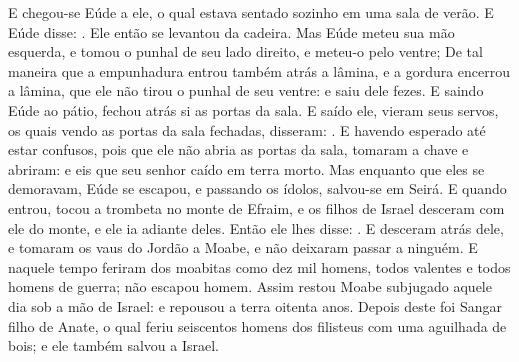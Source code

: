 {  E chegou-se Eúde a ele, o qual estava sentado sozinho em uma sala de verão. E Eúde disse: . Ele então se levantou da cadeira.
  Mas Eúde meteu sua mão esquerda, e tomou o punhal de seu lado direito, e meteu-o pelo ventre;
  De tal maneira que a empunhadura entrou também atrás a lâmina, e a gordura encerrou a lâmina, que ele não tirou o punhal de seu ventre: e saiu dele fezes.
  E saindo Eúde ao pátio, fechou atrás {} si as portas da sala.
  E saído ele, vieram seus servos, os quais vendo as portas da sala fechadas, disseram: .
  E havendo esperado até estar confusos, pois que ele não abria as portas da sala, tomaram a chave e abriram: e eis que seu senhor caído em terra morto.
  Mas enquanto que eles se demoravam, Eúde se escapou, e passando os ídolos, salvou-se em Seirá.
  E quando entrou, tocou a trombeta no monte de Efraim, e os filhos de Israel desceram com ele do monte, e ele ia adiante deles.
  Então ele lhes disse: . E desceram atrás dele, e tomaram os vaus do Jordão a Moabe, e não deixaram passar a ninguém.
  E naquele tempo feriram dos moabitas como dez mil homens, todos valentes e todos homens de guerra; não escapou homem.
  Assim restou Moabe subjugado aquele dia sob a mão de Israel: e repousou a terra oitenta anos.
  Depois deste foi Sangar filho de Anate, o qual feriu seiscentos homens dos filisteus com uma aguilhada de bois; e ele também salvou a Israel.
\par }

